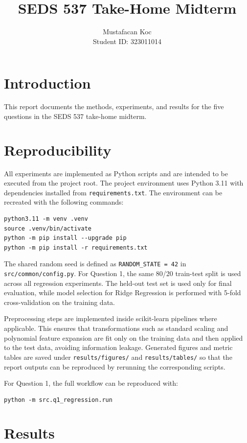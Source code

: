 \documentclass[11pt]{article}
\title{SEDS 537 Take-Home Midterm}
\author{Mustafacan Koc \\ Student ID: 323011014}
\date{}
\begin{document}
\maketitle

\section{Introduction}
This report documents the methods, experiments, and results for the five questions in the SEDS 537 take-home midterm.

\section{Reproducibility}
All experiments are implemented as Python scripts and are intended to be executed from the project root. The project environment uses Python 3.11 with dependencies installed from \texttt{requirements.txt}. The environment can be recreated with the following commands:

\begin{verbatim}
python3.11 -m venv .venv
source .venv/bin/activate
python -m pip install --upgrade pip
python -m pip install -r requirements.txt
\end{verbatim}

The shared random seed is defined as \texttt{RANDOM\_STATE = 42} in \texttt{src/common/config.py}. For Question 1, the same 80/20 train-test split is used across all regression experiments. The held-out test set is used only for final evaluation, while model selection for Ridge Regression is performed with 5-fold cross-validation on the training data.

Preprocessing steps are implemented inside scikit-learn pipelines where applicable. This ensures that transformations such as standard scaling and polynomial feature expansion are fit only on the training data and then applied to the test data, avoiding information leakage. Generated figures and metric tables are saved under \texttt{results/figures/} and \texttt{results/tables/} so that the report outputs can be reproduced by rerunning the corresponding scripts.

For Question 1, the full workflow can be reproduced with:

\begin{verbatim}
python -m src.q1_regression.run
\end{verbatim}

\section{Results}
\end{document}
